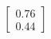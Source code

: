 \documentclass[preview]{standalone}
\begin{document}
\begin{align*}
\begin{bmatrix} 0.76 \\ 0.44 \end{bmatrix}
\end{align*}
\end{document}
